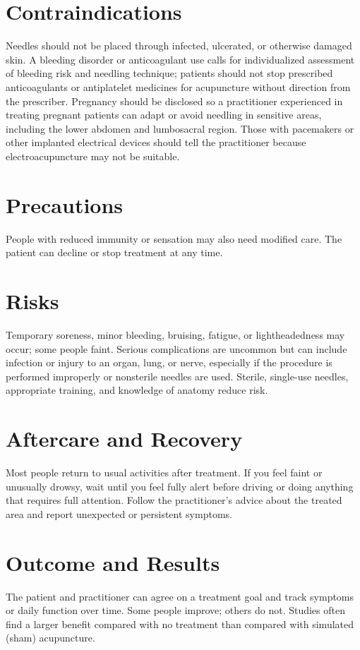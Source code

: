 \section*{Contraindications}
Needles should not be placed through infected, ulcerated, or otherwise damaged skin. A bleeding disorder or anticoagulant use calls for individualized assessment of bleeding risk and needling technique; patients should not stop prescribed anticoagulants or antiplatelet medicines for acupuncture without direction from the prescriber. Pregnancy should be disclosed so a practitioner experienced in treating pregnant patients can adapt or avoid needling in sensitive areas, including the lower abdomen and lumbosacral region. Those with pacemakers or other implanted electrical devices should tell the practitioner because electroacupuncture may not be suitable.

\section*{Precautions}
People with reduced immunity or sensation may also need modified care. The patient can decline or stop treatment at any time.

\section*{Risks}
Temporary soreness, minor bleeding, bruising, fatigue, or lightheadedness may occur; some people faint. Serious complications are uncommon but can include infection or injury to an organ, lung, or nerve, especially if the procedure is performed improperly or nonsterile needles are used. Sterile, single-use needles, appropriate training, and knowledge of anatomy reduce risk.

\section*{Aftercare and Recovery}
Most people return to usual activities after treatment. If you feel faint or unusually drowsy, wait until you feel fully alert before driving or doing anything that requires full attention. Follow the practitioner's advice about the treated area and report unexpected or persistent symptoms.

\section*{Outcome and Results}
The patient and practitioner can agree on a treatment goal and track symptoms or daily function over time. Some people improve; others do not. Studies often find a larger benefit compared with no treatment than compared with simulated (sham) acupuncture.

